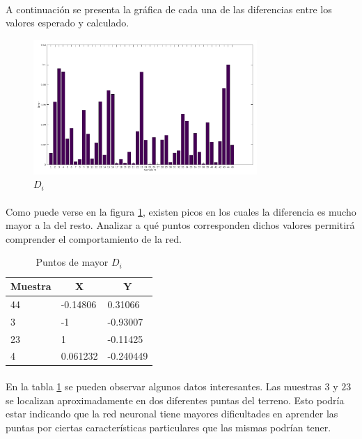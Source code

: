 \documentclass[12pt, twocolumn]{article}
\begin{document}
	\paragraph{} A continuación se presenta la gráfica de cada una de las diferencias entre los valores esperado y calculado.
	
	\begin{figure}[H]
		\centering
		\includegraphics[width=8.5cm]{../results/adaptive_eta_incremental/3/bar_incremental.png}
		\caption{$D_i$}
		\label{di1}
	\end{figure}
	
	\paragraph{} Como puede verse en la figura \ref{di1}, existen picos en los cuales la diferencia es mucho mayor a la del resto. Analizar a qué puntos corresponden dichos valores permitirá comprender el comportamiento de la red.
	
	\begin{table}[H]
		\centering
		\begin{tabular}{lll}
			\hline
			Muestra & \multicolumn{1}{c}{X} & \multicolumn{1}{c}{Y} \\ \hline
			44      & -0.14806              & 0.31066               \\
			3       & -1                    & -0.93007              \\
			23      & 1                     & -0.11425              \\
			4       & 0.061232              & -0.240449             \\ \hline
		\end{tabular}
		\caption{Puntos de mayor $D_{i}$}
		\label{p1}
	\end{table}
	
	\paragraph{} En la tabla \ref{p1} se pueden observar algunos datos interesantes. Las muestras $3$ y $23$ se localizan aproximadamente en dos diferentes puntas del terreno. Esto podría estar indicando que la red neuronal tiene mayores dificultades en aprender las puntas por ciertas características particulares que las mismas podrían tener.
	
\end{document}
